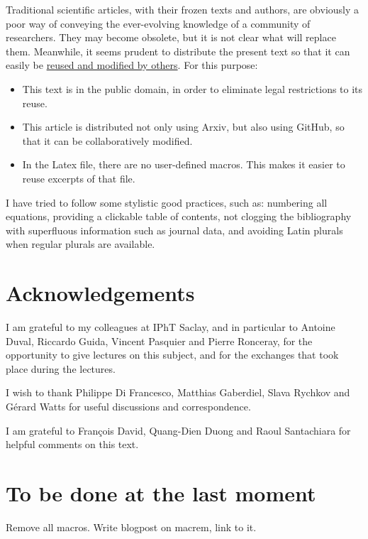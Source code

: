 \documentclass[12pt,a4paper,notitlepage]{report}
\numberwithin{equation}{section}
\theoremstyle{break}
\begin{document}
Traditional scientific articles, with their frozen texts and authors, are obviously a poor way of conveying the ever-evolving knowledge of a community of researchers. They may become obsolete, but it is not clear what will replace them. Meanwhile, it seems prudent to distribute the present text so that it can easily be 
\href{http://researchpracticesandtools.blogspot.fr/2014/02/the-case-for-emancipating-articles-from.html}
{reused and modified by others}. For this purpose:
\begin{itemize}
 \item This text is in the public domain, in order to eliminate legal restrictions to its reuse. 
\item This article is distributed not only using Arxiv, but also using GitHub, so that it can be collaboratively modified. 
\item In the Latex file, there are no user-defined macros. This makes it easier to reuse excerpts of that file. 
\end{itemize}

I have tried to follow some stylistic good practices, such as: numbering all equations, providing a clickable table of contents, not clogging the bibliography with superfluous information such as journal data, and avoiding Latin plurals when regular plurals are available.


\section{Acknowledgements}

I am grateful to my colleagues at IPhT Saclay, and in particular to Antoine Duval, Riccardo Guida, Vincent Pasquier and Pierre Ronceray, for the opportunity to give lectures on this subject, and for the exchanges that took place during the lectures.

I wish to thank Philippe Di Francesco, Matthias Gaberdiel, Slava Rychkov and G\'erard Watts for useful discussions and correspondence.

I am grateful to Fran\c{c}ois David, Quang-Dien Duong and Raoul Santachiara for helpful comments on this text.


\section{To be done at the last moment}

Remove all macros. Write blogpost on macrem, link to it.
\end{document}

